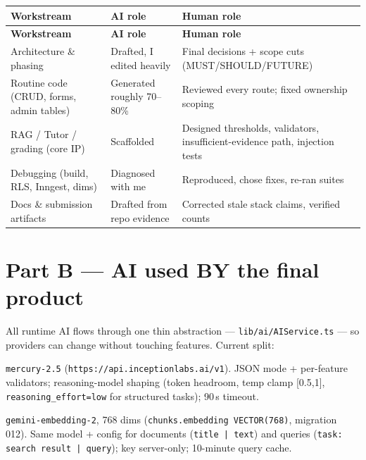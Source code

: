 \documentclass[11pt,a4paper]{article}
\begin{document}
\begin{longtable}{p{3.6cm}p{5.4cm}p{5.9cm}}
\toprule
\textbf{Workstream} & \textbf{AI role} & \textbf{Human role} \\
\midrule
\endfirsthead
\toprule
\textbf{Workstream} & \textbf{AI role} & \textbf{Human role} \\
\midrule
\endhead
Architecture \& phasing & Drafted, I edited heavily & Final decisions + scope cuts (MUST/SHOULD/FUTURE) \\
Routine code (CRUD, forms, admin tables) & Generated roughly 70--80\% & Reviewed every route; fixed ownership scoping \\
RAG / Tutor / grading (core IP) & Scaffolded & Designed thresholds, validators, insufficient-evidence path, injection tests \\
Debugging (build, RLS, Inngest, dims) & Diagnosed with me & Reproduced, chose fixes, re-ran suites \\
Docs \& submission artifacts & Drafted from repo evidence & Corrected stale stack claims, verified counts \\
\bottomrule
\end{longtable}

\section{Part B --- AI used BY the final product}

All runtime AI flows through one thin abstraction --- \texttt{lib/ai/AIService.ts} ---
so providers can change without touching features. Current split:

\begin{description}[leftmargin=1.2cm,style=nextline]
\item[Chat / structured / evaluation $\rightarrow$ Mercury]
\texttt{mercury-2.5} (\texttt{https://api.inceptionlabs.ai/v1}).
JSON mode + per-feature validators; reasoning-model shaping
(token headroom, temp clamp [0.5,1], \texttt{reasoning\_effort=low} for structured tasks); 90\,s timeout.
\item[Embeddings $\rightarrow$ Google Gemini]
\texttt{gemini-embedding-2}, 768 dims (\texttt{chunks.embedding VECTOR(768)}, migration 012).
Same model + config for documents (\texttt{title | text}) and queries
(\texttt{task: search result | query}); key server-only; 10-minute query cache.
\end{description}
\end{document}

